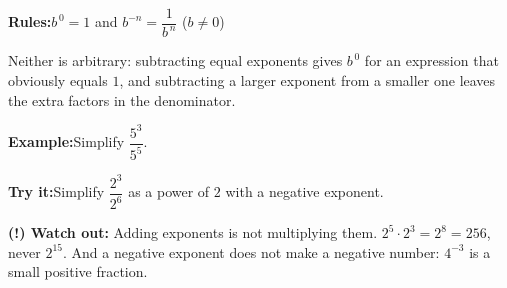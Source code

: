 \documentclass[12pt]{article}
\begin{document}

\begin{formulabox}\textbf{Rules:}\quad $b^{\,0} = 1$ \quad and \quad
$b^{-n} = \dfrac{1}{b^{\,n}}$ \quad ($b \neq 0$)\par
Neither is arbitrary: subtracting equal exponents gives $b^{\,0}$ for an
expression that obviously equals $1$, and subtracting a larger exponent from a
smaller one leaves the extra factors in the denominator.
\end{formulabox}

\begin{examplebox}\textbf{Example:}\quad Simplify $\dfrac{5^3}{5^5}$.
\end{examplebox}

\begin{tryitbox}\textbf{Try it:}\quad Simplify $\dfrac{2^3}{2^6}$ as a power
of $2$ with a negative exponent.
\ \end{tryitbox}

\begin{watchoutbox}\textbf{(!) Watch out:} Adding exponents is not multiplying
them. $2^5 \cdot 2^3 = 2^8 = 256$, never $2^{15}$. And a negative exponent does
not make a negative number: $4^{-3}$ is a small positive fraction.
\end{watchoutbox}
\end{document}
